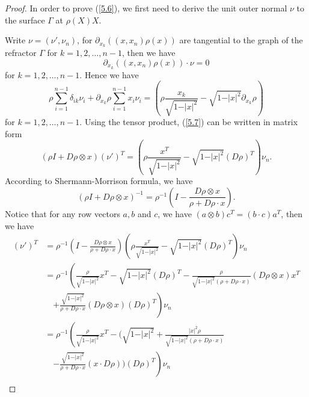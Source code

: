 \documentclass[10pt,a4paper]{amsart}
\begin{document}
\begin{proof}
  In order to prove (\ref{5.6}), we first need to derive the unit outer normal $\nu$ to the surface $\Gamma$ at $\rho(X)X$.

  Write $\nu = (\nu',\nu_{n})$, for $\partial_{x_{k}}((x,x_{n})\rho(x))$ are tangential to the graph of the refractor $\Gamma$ for $k = 1,2,\ldots,n-1$, then we have
  $$\partial_{x_{k}}((x,x_{n})\rho(x))\cdot \nu = 0$$
  for $k = 1,2,\ldots,n-1$. Hence we have
  \begin{equation}\label{5.7}
    \rho \sum_{i = 1}^{n-1}\delta_{ik}\nu_{i} + \partial_{x_{k}}\rho \sum_{i = 1}^{n-1}x_{i}\nu_{i} = \left(\rho \frac{x_{k}}{\sqrt{1 - \vert x \vert^{2}}} - \sqrt{1 - \vert x \vert^{2}}\partial_{x_{k}}\rho\right)
  \end{equation}
  for $k = 1,2,\ldots,n-1$. Using the tensor product, (\ref{5.7}) can be written in matrix form
  \begin{equation}\label{5.8}
    (\rho I + D\rho \otimes x)(\nu')^{T} = \left(\rho \frac{x^{T}}{\sqrt{1 - \vert x \vert^{2}}} - \sqrt{1 - \vert x \vert^{2}}(D\rho)^{T}\right)\nu_{n}.
  \end{equation}
  According to Shermann-Morrison formula, we have
  \begin{equation*}
    (\rho I + D\rho \otimes x)^{-1} = \rho^{-1}\left(I - \frac{D\rho \otimes x}{\rho + D\rho \cdot x}\right).
  \end{equation*}
  Notice that for any row vectors $a,b$ and $c$, we have $(a \otimes b)c^{T} = (b \cdot c)a^{T}$, then we have
  \begin{align*}
    (\nu')^{T} & = \rho^{-1}\left(I - \frac{D\rho \otimes x}{\rho + D\rho \cdot x}\right)\left(\rho \frac{x^{T}}{\sqrt{1 - \vert x \vert^{2}}} - \sqrt{1 - \vert x \vert^{2}}(D\rho)^{T}\right)\nu_{n} \\
     & = \rho^{-1}\left(\frac{\rho}{\sqrt{1 - \vert x \vert^{2}}}x^{T} - \sqrt{1 - \vert x \vert^{2}}(D\rho)^{T} - \frac{\rho}{\sqrt{1 - \vert x \vert^{2}}(\rho + D\rho \cdot x)}(D\rho \otimes x)x^{T}\right. \\
     & \quad \left. + \frac{\sqrt{1 - \vert x \vert^{2}}}{\rho + D\rho \cdot x}(D\rho \otimes x)(D\rho)^{T}\right)\nu_{n} \\
     & = \rho^{-1}\left(\frac{\rho}{\sqrt{1 - \vert x \vert^{2}}}x^{T} - (\sqrt{1 - \vert x \vert^{2}} + \frac{\vert x \vert^{2}\rho}{\sqrt{1 - \vert x \vert^{2}}(\rho + D\rho \cdot x)}\right. \\
     & \quad \left. - \frac{\sqrt{1 - \vert x \vert^{2}}}{\rho + D\rho \cdot x}(x \cdot D\rho))(D\rho)^{T}\right)\nu_{n} \\

\end{align*}
\end{proof}
\end{document}
